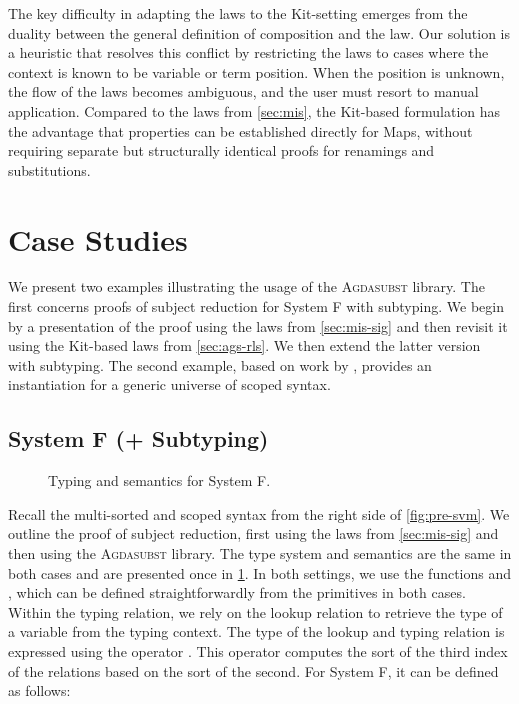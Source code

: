 \documentclass[screen,nonacm]{acmart}
\begin{document}
The key difficulty in adapting the laws to the Kit-setting emerges from the
duality between the general definition of composition  and
the  law. Our solution is a heuristic that resolves
this conflict by restricting the laws to cases where the context is known to be
variable or term position. When the position is unknown, the flow of the laws
becomes ambiguous, and the user must resort to manual application. Compared to
the laws from \cref{sec:mis}, the Kit-based formulation has the advantage that
properties can be established directly for Maps, without requiring separate but
structurally identical proofs for renamings and substitutions.

\section{Case Studies}\label{sec:ext}
We present two examples illustrating the usage of the \textsc{Agdasubst}
library. The first concerns proofs of subject reduction for System F with
subtyping. We begin by a presentation of the proof using the laws from
\cref{sec:mis-sig} and then revisit it using the Kit-based laws from
\cref{sec:ags-rls}. We then extend the latter version with subtyping. The
second example, based on work by \citet{allais2021typescopesafeuniverse},
provides an instantiation for a generic universe of scoped syntax.
\subsection{System F (+ Subtyping)}\label{sec:ext-syf}

\begin{figure}[!t]
      \centering
      \begin{minipage}[t]{0.48\linewidth}
            \raggedright{}
            \ETyping{}
      \end{minipage}
      \hfill
      \begin{minipage}[t]{0.48\linewidth}
            \raggedright{}
            \ESemantics{}
      \end{minipage}
      \caption{Typing and semantics for System F.}\label{fig:ext-tas}
\end{figure}

Recall the multi-sorted and scoped syntax from the right side of
\cref{fig:pre-svm}. We outline the proof of subject reduction, first using the
laws from \cref{sec:mis-sig} and then using the \textsc{Agdasubst} library. The
type system and semantics are the same in both cases and are presented once in
\cref{fig:ext-tas}. In both settings, we use the functions \EWk{} and
\ESubst{}, which can be defined straightforwardly from the primitives in both
cases. Within the typing relation, we rely on the lookup relation \ELookup{} to
retrieve the type of a variable from the typing context. The type of the lookup
and typing relation is expressed using the operator . This
operator computes the sort of the third index of the relations based on the
sort of the second. For System F, it can be defined as follows:
\end{document}
